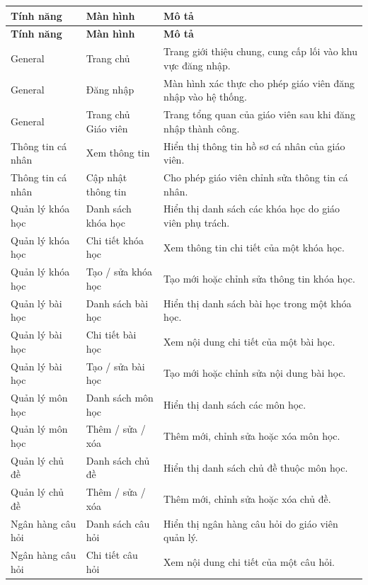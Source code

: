 \documentclass[11pt,a4paper]{article}
\begin{document}
\begin{longtable}{|L{3.0cm}|L{3.6cm}|L{8.0cm}|}
\hline
{}
\textbf{Tính năng} & \textbf{Màn hình} & \textbf{Mô tả} \\ \hline
\endfirsthead
\hline
{}
\textbf{Tính năng} & \textbf{Màn hình} & \textbf{Mô tả} \\ \hline
\endhead
General & Trang chủ & Trang giới thiệu chung, cung cấp lối vào khu vực đăng nhập. \\ \hline
General & Đăng nhập & Màn hình xác thực cho phép giáo viên đăng nhập vào hệ thống. \\ \hline
General & Trang chủ Giáo viên & Trang tổng quan của giáo viên sau khi đăng nhập thành công. \\ \hline
Thông tin cá nhân & Xem thông tin & Hiển thị thông tin hồ sơ cá nhân của giáo viên. \\ \hline
Thông tin cá nhân & Cập nhật thông tin & Cho phép giáo viên chỉnh sửa thông tin cá nhân. \\ \hline
Quản lý khóa học & Danh sách khóa học & Hiển thị danh sách các khóa học do giáo viên phụ trách. \\ \hline
Quản lý khóa học & Chi tiết khóa học & Xem thông tin chi tiết của một khóa học. \\ \hline
Quản lý khóa học & Tạo / sửa khóa học & Tạo mới hoặc chỉnh sửa thông tin khóa học. \\ \hline
Quản lý bài học & Danh sách bài học & Hiển thị danh sách bài học trong một khóa học. \\ \hline
Quản lý bài học & Chi tiết bài học & Xem nội dung chi tiết của một bài học. \\ \hline
Quản lý bài học & Tạo / sửa bài học & Tạo mới hoặc chỉnh sửa nội dung bài học. \\ \hline
Quản lý môn học & Danh sách môn học & Hiển thị danh sách các môn học. \\ \hline
Quản lý môn học & Thêm / sửa / xóa & Thêm mới, chỉnh sửa hoặc xóa môn học. \\ \hline
Quản lý chủ đề & Danh sách chủ đề & Hiển thị danh sách chủ đề thuộc môn học. \\ \hline
Quản lý chủ đề & Thêm / sửa / xóa & Thêm mới, chỉnh sửa hoặc xóa chủ đề. \\ \hline
Ngân hàng câu hỏi & Danh sách câu hỏi & Hiển thị ngân hàng câu hỏi do giáo viên quản lý. \\ \hline
Ngân hàng câu hỏi & Chi tiết câu hỏi & Xem nội dung chi tiết của một câu hỏi. \\ \hline

\end{longtable}
\end{document}
